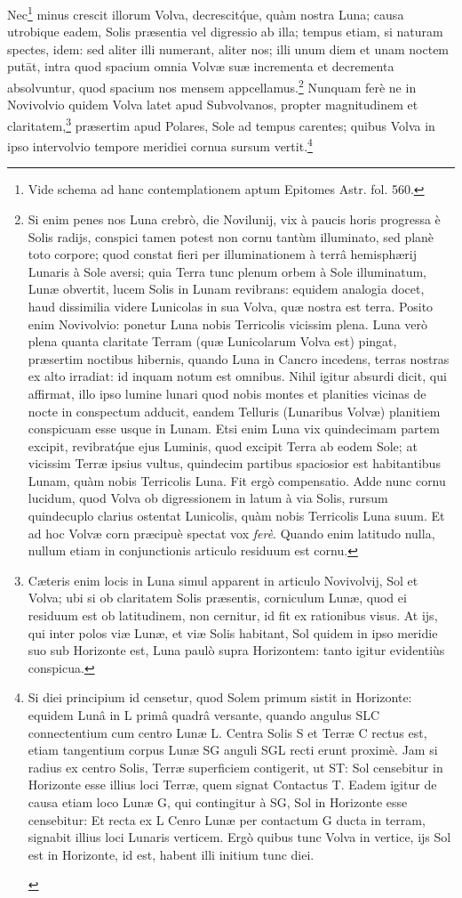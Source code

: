 \documentclass[a4paper, 11pt, oneside, polutonikogreek, german]{article}
\begin{document}
Nec\footnote{Vide schema ad hanc contemplationem aptum Epitomes Astr. fol. 560.} minus crescit illorum Volva, decrescit\'que, quàm nostra Luna; causa utrobique eadem, Solis præsentia vel digressio ab illa; tempus etiam, si naturam spectes, idem: sed aliter illi numerant, aliter nos; illi unum diem et unam noctem putāt, intra quod spacium omnia Volvæ suæ incrementa et decrementa absolvuntur, quod spacium nos mensem appcellamus.\footnote{Si enim penes nos Luna crebrò, die Novilunij, vix à paucis horis progressa è Solis radijs, conspici tamen potest non cornu tantùm illuminato, sed planè toto corpore; quod constat fieri per illuminationem à terrâ hemisphærij Lunaris à Sole aversi; quia Terra tunc plenum orbem à Sole illuminatum, Lunæ obvertit, lucem Solis in Lunam revibrans: equidem analogia docet, haud dissimilia videre Lunicolas in sua Volva, quæ nostra est terra. Posito enim Novivolvio: ponetur Luna nobis Terricolis vicissim plena. Luna verò plena quanta claritate Terram (quæ Lunicolarum Volva est) pingat, præsertim noctibus hibernis, quando Luna in Cancro incedens, terras nostras ex alto irradiat: id inquam notum est omnibus. Nihil igitur absurdi dicit, qui affirmat, illo ipso lumine lunari quod nobis montes et planities vicinas de nocte in conspectum adducit, eandem Telluris (Lunaribus Volvæ) planitiem conspicuam esse usque in Lunam. Etsi enim Luna vix quindecimam partem excipit, revibrat\'que ejus Luminis, quod excipit Terra ab eodem Sole; at vicissim Terræ ipsius vultus, quindecim partibus spaciosior est habitantibus Lunam, quàm nobis Terricolis Luna. Fit ergò compensatio. Adde nunc cornu lucidum, quod Volva ob digressionem in latum à via Solis, rursum quindecuplo clarius ostentat Lunicolis, quàm nobis Terricolis Luna suum. Et ad hoc Volvæ corn præcipuè spectat vox \emph{ferè}. Quando enim latitudo nulla, nullum etiam in conjunctionis articulo residuum est cornu.} Nunquam ferè ne in Novivolvio quidem Volva latet apud Subvolvanos, propter magnitudinem et claritatem,\footnote{Cæteris enim locis in Luna simul apparent in articulo Novivolvij, Sol et Volva; ubi si ob claritatem Solis præsentis, corniculum Lunæ, quod ei residuum est ob latitudinem, non cernitur, id fit ex rationibus visus. At ijs, qui inter polos viæ Lunæ, et viæ Solis habitant, Sol quidem in ipso meridie suo sub Horizonte est, Luna paulò supra Horizontem: tanto igitur evidentiùs conspicua.} præsertim apud Polares, Sole ad tempus carentes; quibus Volva in ipso intervolvio tempore meridiei cornua sursum vertit.\footnote{Si diei principium id censetur, quod Solem primum sistit in Horizonte: equidem Lunâ in L primâ quadrâ versante, quando angulus SLC connectentium cum centro Lunæ L. Centra Solis S et Terræ C rectus est, etiam tangentium corpus Lunæ SG anguli SGL recti erunt proximè. Jam si radius ex centro Solis, Terræ superficiem contigerit, ut ST: Sol censebitur in Horizonte esse illius loci Terræ, quem signat Contactus T. Eadem igitur de causa etiam loco Lunæ G, qui contingitur à SG, Sol in Horizonte esse censebitur: Et recta ex L Cenro Lunæ per contactum G ducta in terram, signabit illius loci Lunaris verticem. Ergò quibus tunc Volva in vertice, ijs Sol est in Horizonte, id est, habent illi initium tunc diei.\begin{figure}[H]

\end{figure}}
\end{document}

